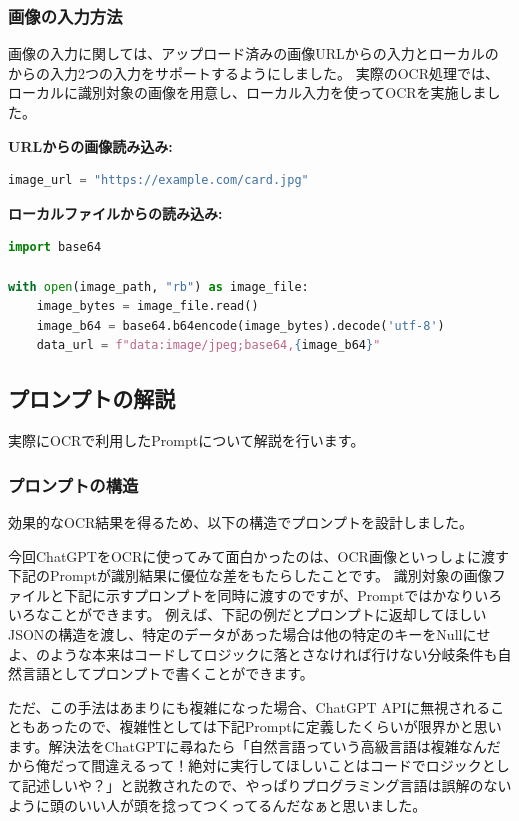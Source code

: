 \subsubsection*{画像の入力方法}
画像の入力に関しては、アップロード済みの画像URLからの入力とローカルのからの入力2つの入力をサポートするようにしました。
実際のOCR処理では、ローカルに識別対象の画像を用意し、ローカル入力を使ってOCRを実施しました。


\textbf{URLからの画像読み込み:}
\begin{lstlisting}[language=Python]
image_url = "https://example.com/card.jpg"
\end{lstlisting}

\textbf{ローカルファイルからの読み込み:}
\begin{lstlisting}[language=Python]
import base64

with open(image_path, "rb") as image_file:
    image_bytes = image_file.read()
    image_b64 = base64.b64encode(image_bytes).decode('utf-8')
    data_url = f"data:image/jpeg;base64,{image_b64}"
\end{lstlisting}

\subsection*{プロンプトの解説}
実際にOCRで利用したPromptについて解説を行います。

\subsubsection*{プロンプトの構造}

効果的なOCR結果を得るため、以下の構造でプロンプトを設計しました。

今回ChatGPTをOCRに使ってみて面白かったのは、OCR画像といっしょに渡す下記のPromptが識別結果に優位な差をもたらしたことです。
識別対象の画像ファイルと下記に示すプロンプトを同時に渡すのですが、Promptではかなりいろいろなことができます。
例えば、下記の例だとプロンプトに返却してほしいJSONの構造を渡し、特定のデータがあった場合は他の特定のキーをNullにせよ、のような本来はコードしてロジックに落とさなければ行けない分岐条件も自然言語としてプロンプトで書くことができます。

ただ、この手法はあまりにも複雑になった場合、ChatGPT APIに無視されることもあったので、複雑性としては下記Promptに定義したくらいが限界かと思います。解決法をChatGPTに尋ねたら「自然言語っていう高級言語は複雑なんだから俺だって間違えるって！絶対に実行してほしいことはコードでロジックとして記述しいや？」と説教されたので、やっぱりプログラミング言語は誤解のないように頭のいい人が頭を捻ってつくってるんだなぁと思いました。

